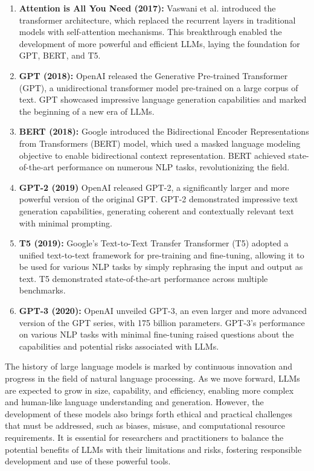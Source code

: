\begin{enumerate}
    \item \textbf{Attention is All You Need (2017)\cite{vaswani2023attention}:} Vaswani et al. introduced the transformer architecture, which replaced the recurrent layers in traditional models with self-attention mechanisms. This breakthrough enabled the development of more powerful and efficient LLMs, laying the foundation for GPT, BERT, and T5.
    \item \textbf{GPT (2018)\cite{openai:gpt}:} OpenAI released the Generative Pre-trained Transformer (GPT), a unidirectional transformer model pre-trained on a large corpus of text. GPT showcased impressive language generation capabilities and marked the beginning of a new era of LLMs.
    \item \textbf{BERT (2018)\cite{devlin2019bert}:} Google introduced the Bidirectional Encoder Representations from Transformers (BERT) model, which used a masked language modeling objective to enable bidirectional context representation. BERT achieved state-of-the-art performance on numerous NLP tasks, revolutionizing the field.
    \item \textbf{GPT-2 (2019)\cite{radford2019language}} OpenAI released GPT-2, a significantly larger and more powerful version of the original GPT. GPT-2 demonstrated impressive text generation capabilities, generating coherent and contextually relevant text with minimal prompting.
    \item \textbf{T5 (2019)\cite{raffel2023exploring}:} Google's Text-to-Text Transfer Transformer (T5) adopted a unified text-to-text framework for pre-training and fine-tuning, allowing it to be used for various NLP tasks by simply rephrasing the input and output as text. T5 demonstrated state-of-the-art performance across multiple benchmarks.
    \item \textbf{GPT-3 (2020)\cite{brown2020language}:} OpenAI unveiled GPT-3, an even larger and more advanced version of the GPT series, with 175 billion parameters. GPT-3's performance on various NLP tasks with minimal fine-tuning raised questions about the capabilities and potential risks associated with LLMs.
\end{enumerate}

The history of large language models is marked by continuous innovation and progress in the field of natural language processing. As we move forward, LLMs are expected to grow in size, capability, and efficiency, enabling more complex and human-like language understanding and generation. However, the development of these models also brings forth ethical and practical challenges that must be addressed, such as biases, misuse, and computational resource requirements. It is essential for researchers and practitioners to balance the potential benefits of LLMs with their limitations and risks, fostering responsible development and use of these powerful tools.
